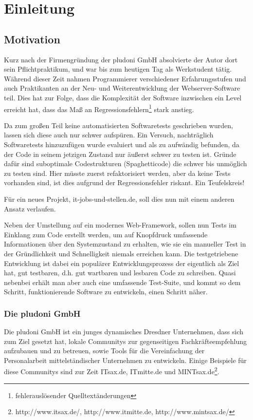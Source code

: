 

\section{Einleitung}
\subsection{Motivation}

Kurz nach der Firmengründung der pludoni GmbH absolvierte der Autor dort sein Pflichtpraktikum, und war bis zum heutigen Tag als Werkstudent tätig.
Während dieser Zeit nahmen Programmierer verschiedener Erfahrungsstufen und auch Praktikanten an der Neu- und Weiterentwicklung der Webserver-Software teil. Dies hat zur Folge, dass die Komplexität der Software inzwischen ein Level erreicht hat, dass das Maß an Regressionsfehlern\footnote{fehlerauslösender Quelltextänderungen} stark anstieg. 

Da zum großen Teil keine automatisierten Softwaretests geschrieben wurden, lassen sich diese auch nur schwer aufspüren. Ein Versuch, nachträglich Softwaretests hinzuzufügen wurde evaluiert und als zu aufwändig befunden, da der Code in seinem jetzigen Zustand nur äußerst schwer zu testen ist. Gründe dafür sind suboptimale Codestrukturen (Spaghetticode) die schwer bis unmöglich zu testen sind. Hier müsste zuerst refaktorisiert werden, aber da keine Tests vorhanden sind, ist dies aufgrund der Regressionsfehler riskant. Ein Teufelskreis!

Für ein neues Projekt, it-jobs-und-stellen.de, soll dies nun mit einem anderen Ansatz verlaufen. 

Neben der Umstellung auf ein modernes Web-Framework, sollen nun Tests im Einklang zum Code erstellt werden, um auf Knopfdruck  umfassende Informationen über den Systemzustand zu erhalten, wie sie ein manueller Test in der Gründlichkeit und Schnelligkeit niemals erreichen kann. Die testgetriebene Entwicklung ist dabei ein populärer Entwicklungsprozess der eigentlich als Ziel hat, gut testbaren, d.h. gut wartbaren und lesbaren Code zu schreiben. Quasi nebenbei erhält man aber auch eine umfassende Test-Suite, und kommt so dem Schritt, funktionierende Software zu entwickeln, einen Schritt näher.

\subsubsection{Die pludoni GmbH}

Die pludoni GmbH ist ein junges dynamisches Dresdner Unternehmen, dass sich zum Ziel gesetzt hat, lokale Communitys zur gegenseitigen Fachkräfteempfehlung aufzubauen und zu betreuen, sowie Tools für die Vereinfachung der Personalarbeit mittelständischer Unternehmen zu entwickeln. Einige Beispiele für diese Communitys sind zur Zeit ITsax.de, ITmitte.de und MINTsax.de\footnote{http://www.itsax.de/, http://www.itmitte.de, http://www.mintsax.de/}.
